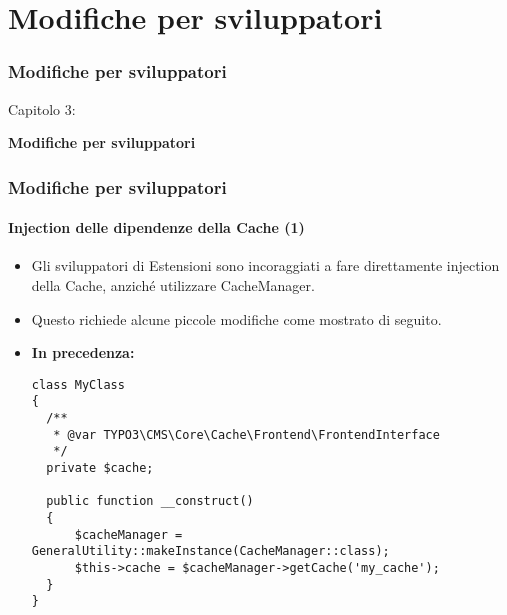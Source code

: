 %

\section{Modifiche per sviluppatori}
\begin{frame}[fragile]
	\frametitle{Modifiche per sviluppatori}

	\begin{center}\huge{Capitolo 3:}\end{center}
	\begin{center}\huge{\color{typo3darkgrey}\textbf{Modifiche per sviluppatori}}\end{center}

\end{frame}


\begin{frame}[fragile]
	\frametitle{Modifiche per sviluppatori}
	\framesubtitle{Injection delle dipendenze della Cache (1)}

	\lstset{basicstyle=\tiny\ttfamily}

	\begin{itemize}
		\item Gli sviluppatori di Estensioni sono incoraggiati a fare direttamente injection della Cache, anziché utilizzare CacheManager.
		\item Questo richiede alcune piccole modifiche come mostrato di seguito.

		\item \textbf{In precedenza:}

\begin{lstlisting}
class MyClass
{
  /**
   * @var TYPO3\CMS\Core\Cache\Frontend\FrontendInterface
   */
  private $cache;

  public function __construct()
  {
      $cacheManager = GeneralUtility::makeInstance(CacheManager::class);
      $this->cache = $cacheManager->getCache('my_cache');
  }
}
\end{lstlisting}

	\end{itemize}

\end{frame}

